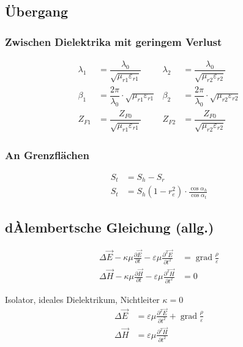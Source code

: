 \subsection{Übergang}
\subsubsection{Zwischen Dielektrika mit geringem Verlust}
\begin{align*}
    \lambda_1 & = \dfrac{\lambda_0}{\sqrt{\mu_{r1}\varepsilon_{r1}}}          & \lambda_2 & = \dfrac{\lambda_0}{\sqrt{\mu_{r2}\varepsilon_{r2}}}                                     \\
    \beta_1   & = \dfrac{2\pi}{\lambda_0}\cdot\sqrt{\mu_{r1}\varepsilon_{r1}} & \beta_2   & = \dfrac{2\pi}{\lambda_0}\cdot\sqrt{\mu_{r2}\varepsilon_{r2}}                            \\
    Z_{F1}    & = \dfrac{Z_{F0}}{\sqrt{\mu_{r1}\varepsilon_{r1}}}             & Z_{F2}    & = \dfrac{Z_{F0}}{\sqrt{\mu_{r2}\varepsilon_{r2}}}
\end{align*}

\subsubsection{An Grenzflächen}
\begin{align*}
    S_t &= S_h - S_r \\
    S_t &= S_h  (1 - r_e^2) \cdot \frac{\cos \alpha_h}{\cos \alpha_t}
\end{align*}

\subsection{dÀlembertsche Gleichung (allg.)}
\begin{align*}
    \Delta \vec{E}-\kappa \mu \frac{\partial \vec{E}}{\partial t}-\varepsilon \mu \frac{\partial^{2} \vec{E}}{\partial t^{2}} & = \operatorname{grad} \frac{\rho}{\varepsilon} \\
    \Delta \vec{H}-\kappa \mu \frac{\partial \vec{H}}{\partial t}-\varepsilon \mu \frac{\partial^{2} \vec{H}}{\partial t^{2}} & = 0
\end{align*}

Isolator, ideales Dielektrikum, Nichtleiter $\kappa = 0$
\begin{align*}
    \Delta \vec{E} & =\varepsilon \mu \frac{\partial^{2} \vec{E}}{\partial t^{2}}+\operatorname{grad} \frac{\rho}{\varepsilon} \\
    \Delta \vec{H} & =\varepsilon \mu \frac{\partial^{2} \vec{H}}{\partial t^{2}}
\end{align*}

